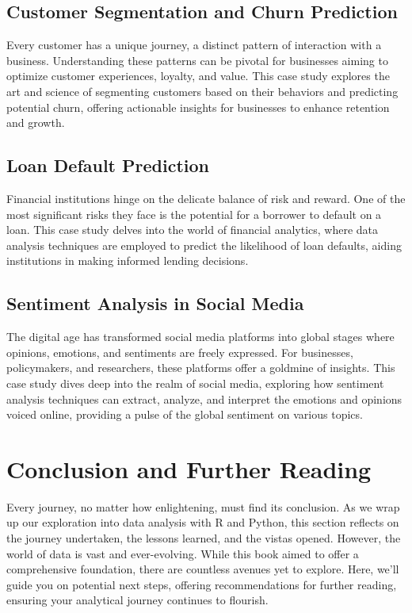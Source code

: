 \documentclass[a4paper,12pt]{book}
\begin{document}
\section{Customer Segmentation and Churn Prediction}
Every customer has a unique journey, a distinct pattern of interaction with a business. Understanding these patterns can be pivotal for businesses aiming to optimize customer experiences, loyalty, and value. This case study explores the art and science of segmenting customers based on their behaviors and predicting potential churn, offering actionable insights for businesses to enhance retention and growth.

\section{Loan Default Prediction}
Financial institutions hinge on the delicate balance of risk and reward. One of the most significant risks they face is the potential for a borrower to default on a loan. This case study delves into the world of financial analytics, where data analysis techniques are employed to predict the likelihood of loan defaults, aiding institutions in making informed lending decisions.

\section{Sentiment Analysis in Social Media}
The digital age has transformed social media platforms into global stages where opinions, emotions, and sentiments are freely expressed. For businesses, policymakers, and researchers, these platforms offer a goldmine of insights. This case study dives deep into the realm of social media, exploring how sentiment analysis techniques can extract, analyze, and interpret the emotions and opinions voiced online, providing a pulse of the global sentiment on various topics.

\chapter*{Conclusion and Further Reading}
Every journey, no matter how enlightening, must find its conclusion. As we wrap up our exploration into data analysis with R and Python, this section reflects on the journey undertaken, the lessons learned, and the vistas opened. However, the world of data is vast and ever-evolving. While this book aimed to offer a comprehensive foundation, there are countless avenues yet to explore. Here, we'll guide you on potential next steps, offering recommendations for further reading, ensuring your analytical journey continues to flourish.
\end{document}
